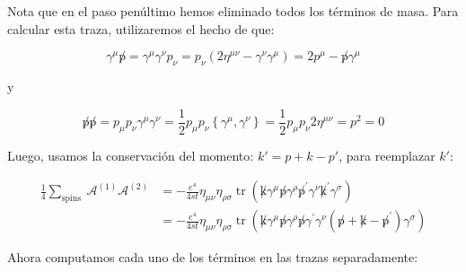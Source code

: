 Nota que en el paso penúltimo hemos eliminado todos los términos de masa. Para calcular esta traza, utilizaremos el hecho de que:


\begin{equation}
  \gamma^\mu \not p=\gamma^\mu \gamma^\nu p_\nu=p_\nu\left(2 \eta^{\mu \nu}-\gamma^\nu \gamma^\mu\right)=2 p^\mu-\not p \gamma^\mu 
\end{equation}

y

\begin{equation}
  \not p \not p=p_\mu p_\nu \gamma^\mu \gamma^\nu=\frac{1}{2} p_\mu p_\nu\left\{\gamma^\mu, \gamma^\nu\right\}=\frac{1}{2} p_\mu p_\nu 2 \eta^{\mu \nu}=p^2=0
\end{equation}

Luego, usamos la conservación del momento: $ k' = p + k - p' $, para reemplazar $ k' $:

\begin{equation}
  \begin{aligned}
  \frac{1}{4} \sum_{\text {spins }} \mathcal{A}^{(1)} \mathcal{A}^{(2)} & =-\frac{e^4}{4 s t} \eta_{\mu \nu} \eta_{\rho \sigma} \operatorname{tr}\left(\not k \gamma^\mu \not p \gamma^\rho \not p^{\prime} \gamma^\nu \not k^{\prime} \gamma^\sigma\right) \\
  & =-\frac{e^4}{4 s t} \eta_{\mu \nu} \eta_{\rho \sigma} \operatorname{tr}\left(\not k \gamma^\mu \not p \gamma^\rho \not p \gamma^{\prime} \gamma^\nu\left(\not p+\not k-\not p^{\prime}\right) \gamma^\sigma\right)
  \end{aligned}
  \end{equation}

Ahora computamos cada uno de los términos en las trazas separadamente:

